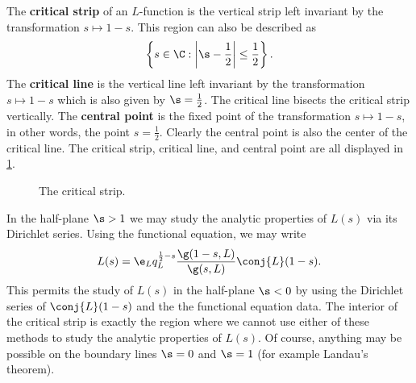 \documentclass[12pt]{article}
\begin{document}
      The \textbf{critical strip} of an \(L\)-function is the vertical strip left invariant by the transformation \(s \mapsto 1-s\). This region can also be described as
      \[
        \left\{s \in \C:\left|\s-\frac{1}{2}\right| \le \frac{1}{2}\right\}.
      \]
      The \textbf{critical line} is the vertical line left invariant by the transformation \(s \mapsto 1-s\) which is also given by \(\s = \frac{1}{2}\). The critical line bisects the critical strip vertically. The \textbf{central point} is the fixed point of the transformation \(s \mapsto 1-s\), in other words, the point \(s = \frac{1}{2}\). Clearly the central point is also the center of the critical line. The critical strip, critical line, and central point are all displayed in \cref{fig:critical_strip}.

      \begin{figure}[h]
        \centering
        \caption{The critical strip.}
        \label{fig:critical_strip}
      \end{figure}

      In the half-plane \(\s > 1\) we may study the analytic properties of \(L(s)\) via its Dirichlet series. Using the functional equation, we may write
      \[
        L(s) = \e_{L}q_{L}^{\frac{1}{2}-s}\frac{\g(1-s,L)}{\g(s,L)}\conj{L}(1-s).
      \]
      This permits the study of \(L(s)\) in the half-plane \(\s < 0\) by using the Dirichlet series of \(\conj{L}(1-s)\) and the the functional equation data. The interior of the critical strip is exactly the region where we cannot use either of these methods to study the analytic properties of \(L(s)\). Of course, anything may be possible on the boundary lines \(\s = 0\) and \(\s = 1\) (for example Landau's theorem).
\end{document}
